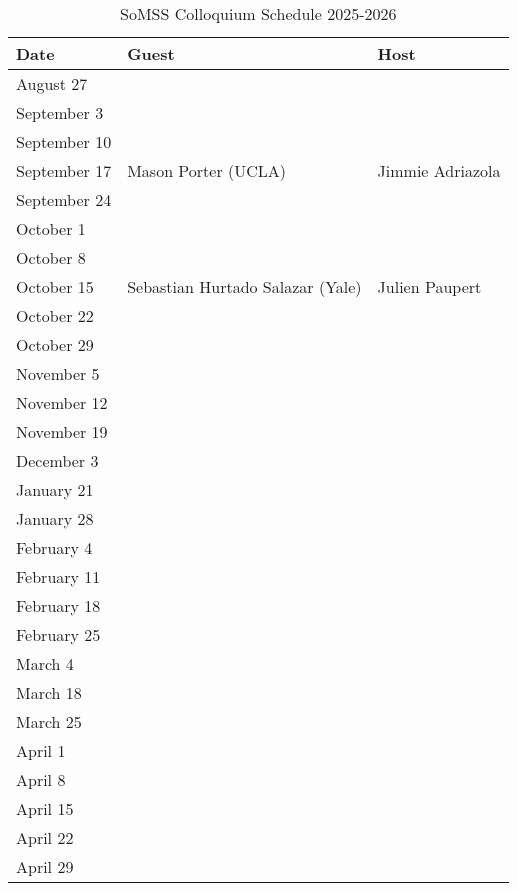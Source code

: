 \documentclass[11pt]{article}
\begin{document}
\begin{table}[htp]
\caption{SoMSS Colloquium Schedule 2025-2026}
\begin{center}
\begin{tabular}{|l|l|l|}
\hline
Date & Guest & Host\\
\hline
August 27 &&\\
September 3 &&\\
September 10 &&\\
September 17 & Mason Porter (UCLA) & Jimmie Adriazola \\
September 24 &&\\
October 1 && \\
October 8 &&\\
October 15 &Sebastian Hurtado Salazar (Yale)& Julien Paupert\\
October 22 &&\\
October 29 &&\\
November 5 &&\\
November 12 && \\
November 19 && \\
December 3 && \\
January 21 && \\
January 28 &&\\
February 4 && \\
February 11 && \\
February 18 &&\\
February 25 && \\
March 4 &&\\
March 18 && \\
March 25 && \\
April 1 && \\
April 8 &&\\
April 15 && \\
April 22 && \\
April 29 && \\
\hline
\end{tabular}
\end{center}
\end{table}%
\end{document}
